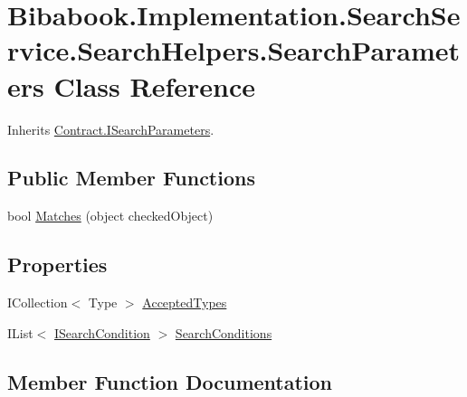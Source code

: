\hypertarget{class_bibabook_1_1_implementation_1_1_search_service_1_1_search_helpers_1_1_search_parameters}{}\section{Bibabook.\+Implementation.\+Search\+Service.\+Search\+Helpers.\+Search\+Parameters Class Reference}
\label{class_bibabook_1_1_implementation_1_1_search_service_1_1_search_helpers_1_1_search_parameters}


Inherits \hyperlink{interface_contract_1_1_i_search_parameters}{Contract.\+I\+Search\+Parameters}.

\subsection*{Public Member Functions}
\begin{DoxyCompactItemize}
\item 
bool \hyperlink{class_bibabook_1_1_implementation_1_1_search_service_1_1_search_helpers_1_1_search_parameters_a670f17e367dd0d4c6971dc5f98eb8124}{Matches} (object checked\+Object)
\end{DoxyCompactItemize}
\subsection*{Properties}
\begin{DoxyCompactItemize}
\item 
I\+Collection$<$ Type $>$ \hyperlink{class_bibabook_1_1_implementation_1_1_search_service_1_1_search_helpers_1_1_search_parameters_a86003b460cfbe9c5e9898d74ce997953}{Accepted\+Types}
\item 
I\+List$<$ \hyperlink{interface_contract_1_1_i_search_condition}{I\+Search\+Condition} $>$ \hyperlink{class_bibabook_1_1_implementation_1_1_search_service_1_1_search_helpers_1_1_search_parameters_a413a985ac5992f1bb35aa0ea74ce80ab}{Search\+Conditions}
\end{DoxyCompactItemize}


\subsection{Member Function Documentation}
\hypertarget{class_bibabook_1_1_implementation_1_1_search_service_1_1_search_helpers_1_1_search_parameters_a670f17e367dd0d4c6971dc5f98eb8124}{}
